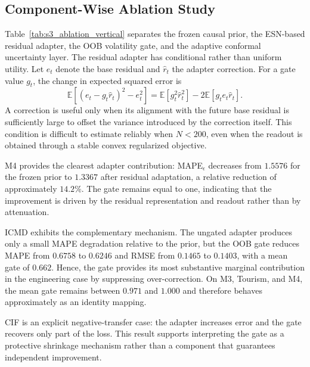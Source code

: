 \subsection{Component-Wise Ablation Study}
\label{subsec:ablation_results}

Table~\ref{tab:s3_ablation_vertical} separates the frozen causal prior, the
ESN-based residual adapter, the OOB volatility gate, and the adaptive conformal
uncertainty layer. The residual adapter has conditional rather than uniform
utility. Let $e_t$ denote the base residual and $\widehat r_t$ the adapter
correction. For a gate value $g_t$, the change in expected squared error is
\begin{equation}
\mathbb{E}\!\left[(e_t-g_t\widehat r_t)^2-e_t^2\right]
=
\mathbb{E}[g_t^2\widehat r_t^2]
-
2\mathbb{E}[g_te_t\widehat r_t].
\label{eq:residual_correction_utility}
\end{equation}
A correction is useful only when its alignment with the future base residual
is sufficiently large to offset the variance introduced by the correction
itself. This condition is difficult to estimate reliably when $N<200$, even
when the readout is obtained through a stable convex regularized objective.

M4 provides the clearest adapter contribution: MAPE$_\epsilon$ decreases from
$1.5576$ for the frozen prior to $1.3367$ after residual adaptation, a relative
reduction of approximately $14.2\%$. The gate remains equal to one, indicating
that the improvement is driven by the residual representation and readout
rather than by attenuation.

ICMD exhibits the complementary mechanism. The ungated adapter produces only a
small MAPE degradation relative to the prior, but the OOB gate reduces MAPE
from $0.6758$ to $0.6246$ and RMSE from $0.1465$ to $0.1403$, with a mean gate
of $0.662$. Hence, the gate provides its most substantive marginal contribution
in the engineering case by suppressing over-correction. On M3, Tourism, and M4,
the mean gate remains between $0.971$ and $1.000$ and therefore behaves
approximately as an identity mapping.

CIF is an explicit negative-transfer case: the adapter increases error and the
gate recovers only part of the loss. This result supports interpreting the gate
as a protective shrinkage mechanism rather than a component that guarantees
independent improvement.

